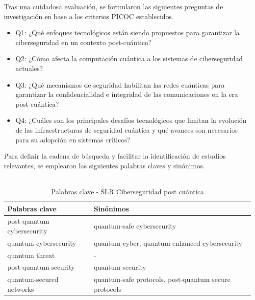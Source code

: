 Tras una cuidadosa evaluación, se formularon las siguientes preguntas de investigación en base a los criterios PICOC establecidos.

\begin{itemize}
    \item Q1: ¿Qué enfoques tecnológicos están siendo propuestos para garantizar la ciberseguridad en un contexto post-cuántico?
    \item Q2: ¿Cómo afecta la computación cuántica a los sistemas de ciberseguridad actuales?
    \item Q3: ¿Qué mecanismos de seguridad habilitan las redes cuánticas para garantizar la confidencialidad e integridad de las comunicaciones en la era post-cuántica?
    \item Q4: ¿Cuáles son los principales desafíos tecnológicos que limitan la evolución de las infraestructuras de seguridad cuántica y qué avances son necesarios para su adopción en sistemas críticos?
\end{itemize}

Para definir la cadena de búsqueda y facilitar la identificación de estudios relevantes, se emplearon las siguientes palabras claves y sinónimos. 

\begin{table}[H]
\centering
\caption[Palabras clave - SLR Ciberseguridad post cuántica]{
    \vspace{4pt}
    \fontsize{12}{11}\selectfont \\
    Palabras clave - SLR Ciberseguridad post cuántica \\[2pt]
}
\label{tab:keywords_slr} %
\begin{tabular}{@{} l p{6cm} @{}} %
\hline\hline
\textbf{Palabras clave} & \textbf{Sinónimos} \\
\hline
post-quantum cybersecurity & quantum-safe cybersecurity \\
\hline
quantum cybersecurity & quantum cyber, quantum-enhanced cybersecurity \\
\hline
quantum threat & - \\
\hline
post-quantum security & quantum security \\
\hline
quantum-secured networks & quantum-safe protocols, post-quantum secure protocols \\
\hline\hline
\end{tabular}
\end{table}

